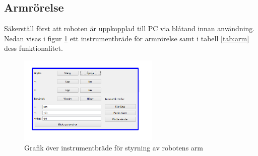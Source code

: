\documentclass[a4paper,12pt]{article}
\begin{document}
\subsection{Armrörelse}
Säkerställ först att roboten är uppkopplad till PC via blåtand innan användning. Nedan visas i figur \ref{fig:pc_arm} ett instrumentbräde för armrörelse samt i tabell \ref{tab:arm} dess funktionalitet.

\begin{figure}[H]
	\centering
	\includegraphics[width=0.6\textwidth]{armrorelse.pdf}
	\caption{Grafik över instrumentbräde för styrning av robotens arm}
	\label{fig:pc_arm}
\end{figure}
\end{document}
